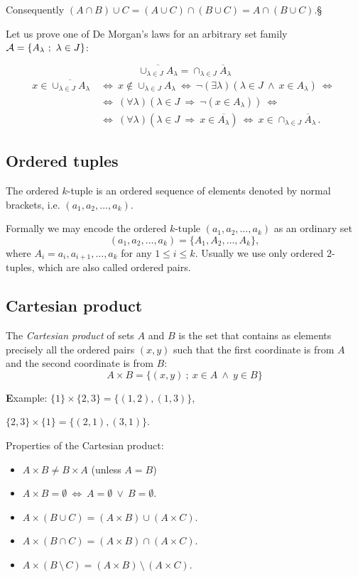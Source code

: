 \documentclass[11pt,paper=b5,footinclude,headinclude]{scrbook} %
\def\ali {{~\vee~}}
\def\inn {{~\wedge~}}
\def\sledi {{~\Rightarrow~}}
\def\brez {{\,\setminus\,}}
\def\cee {{~\Leftrightarrow~}}
\def\kz{{\hfill{\S}}}%
\theoremstyle{remark}
\theoremstyle{definition} %
\begin{document}
Consequently
$(A\cap B)\cup C = (A\cup C)\cap (B\cup C) = A\cap (B\cup C)$.\kz


\bigskip

Let us prove one of De Morgan's laws for an arbitrary set family
${\cal A} = \{A_\lambda~;~\lambda\in J\}$:

$$\overline{\cup_{\lambda\in J}A_\lambda} = {\cap_{\lambda\in J}\overline A_\lambda}$$
\begin{align*}
    x\in \overline{\cup_{\lambda\in J}A_\lambda}
& \cee
x\not\in \cup_{\lambda\in J}A_\lambda
\cee
\neg(\exists \lambda)(\lambda \in J\inn x\in A_\lambda)
\cee 
\\
&\cee(\forall \lambda)(\lambda \in J\sledi \neg(x\in A_\lambda))
\cee \\
& \cee
(\forall \lambda)(\lambda \in J\sledi x\in \overline{A_\lambda})
\cee
x\in {\cap_{\lambda\in J}\overline A_\lambda}\,.
\end{align*}

\subsection*{Ordered tuples}
The ordered $k$-tuple is an ordered sequence of elements denoted by normal brackets, i.e. $(a_1,a_2,\dots,a_k)$.

Formally we may encode the ordered $k$-tuple $(a_1,a_2,\dots,a_k)$ as an ordinary set
\[
(a_1,a_2,\dots,a_k)=\{A_1,A_2,\dots,A_k\},
\]
where $A_i={a_i,a_{i+1},\dots,a_k}$ for any $1\le i\le k$. 
Usually we use only ordered $2$-tuples, which are also called ordered pairs.


\subsection{Cartesian product}

The {\em Cartesian product} of sets $A$ and $B$ is the set that contains as elements precisely all the ordered pairs $(x,y)$ such that
 the first coordinate is from $A$ and the second coordinate is from $B$:
 $$A\times B = \{(x,y)~;~x\in A\inn y\in B\}$$

{\textbf Example:} $\{1\}\times \{2,3\} = \{(1,2),(1,3)\}$,

$\{2,3\}\times \{1\} = \{(2,1),(3,1)\}$.

\bigskip
Properties of the Cartesian product:
\begin{itemize}
  \item $A\times B\neq B\times A$ (unless $A = B$)
  \item $A\times B = \emptyset \cee A= \emptyset \ali B = \emptyset$.
  \item $A\times (B\cup C) = (A\times B) \cup (A\times C)$.
  \item $A\times (B\cap C) = (A\times B) \cap (A\times C)$.
  \item $A\times (B\brez C) = (A\times B) \brez (A\times C)$.
\end{itemize}
\end{document}
